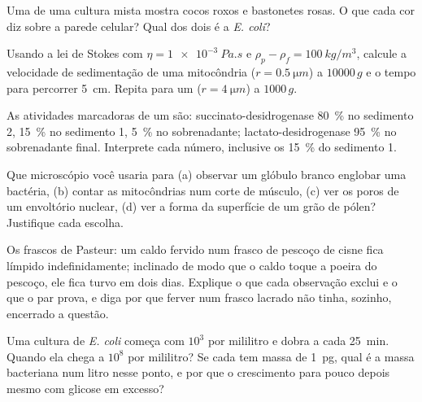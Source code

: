 \begin{exercise}[$\star\star$]\label{exo:b1:cell-unit-of-life:6}
Uma  de uma cultura mista mostra cocos roxos e
bastonetes rosas. O que cada cor diz sobre a parede celular? Qual dos
dois é a \emph{E. coli}?
\end{exercise}

\begin{exercise}[$\star\star$]\label{exo:b1:cell-unit-of-life:7}
Usando a lei de Stokes com $\eta = \qty{1e-3}{Pa.s}$ e $\rho_p - \rho_f =
\qty{100}{kg/m^3}$, calcule a velocidade de sedimentação de uma
mitocôndria ($r = \qty{0.5}{\micro m}$) a $\num{10000}\,g$ e o tempo
para percorrer \qty{5}{cm}. Repita para um 
($r = \qty{4}{\micro m}$) a $1000\,g$.
\end{exercise}

\begin{exercise}[$\star\star$]\label{exo:b1:cell-unit-of-life:8}
As atividades marcadoras de um  são: succinato-desidrogenase
\qty{80}{\%} no sedimento 2, \qty{15}{\%} no sedimento 1, \qty{5}{\%} no
sobrenadante; lactato-desidrogenase \qty{95}{\%} no sobrenadante final.
Interprete cada número, inclusive os \qty{15}{\%} do sedimento 1.
\end{exercise}

\begin{exercise}[$\star\star$]\label{exo:b1:cell-unit-of-life:9}
Que microscópio você usaria para (a) observar um glóbulo branco englobar
uma bactéria, (b) contar as mitocôndrias num corte de músculo, (c) ver
os poros de um envoltório nuclear, (d) ver a forma da superfície de um
grão de pólen? Justifique cada escolha.
\end{exercise}

\begin{exercise}[$\star\star\star$]\label{exo:b1:cell-unit-of-life:10}
Os frascos de Pasteur: um caldo fervido num frasco de pescoço de cisne
fica límpido indefinidamente; inclinado de modo que o caldo toque a
poeira do pescoço, ele fica turvo em dois dias. Explique o que cada
observação exclui e o que o par prova, e diga por que ferver num frasco
lacrado não tinha, sozinho, encerrado a questão.
\end{exercise}

\begin{exercise}[$\star\star\star$]\label{exo:b1:cell-unit-of-life:11}
Uma cultura de \emph{E. coli} começa com $10^3$  por mililitro e
dobra a cada \qty{25}{min}. Quando ela chega a $10^8$ por mililitro? Se
cada  tem massa de \qty{1}{pg}, qual é a massa bacteriana num
litro nesse ponto, e por que o crescimento para pouco depois mesmo com
glicose em excesso?
\end{exercise}

